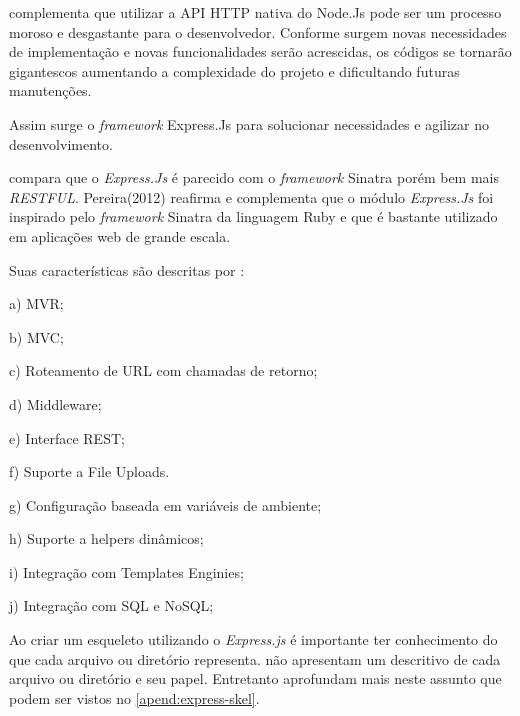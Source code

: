   \cite{Pereira:2013} complementa que utilizar a API HTTP nativa do Node.Js pode ser um processo moroso e desgastante
  para o desenvolvedor. 
  Conforme surgem novas necessidades de implementação e novas funcionalidades serão acrescidas,
  os códigos se tornarão gigantescos aumentando a complexidade do projeto e dificultando futuras manutenções.
  
  Assim surge o \textit{framework} Express.Js para solucionar necessidades e agilizar no desenvolvimento.
  
   compara que o \textit{Express.Js} é parecido com o \textit{framework} Sinatra porém bem mais \textit{RESTFUL}. 
  Pereira(2012) reafirma e complementa que o módulo \textit{Express.Js} foi inspirado pelo \textit{framework} Sinatra da 
  linguagem Ruby e que é bastante utilizado em aplicações web de grande escala.
  
  Suas características são descritas por :
  
  \begin{compactitem}
    \item[a)] \ac{MVR};   
    
    \item[b)] \ac{MVC};
    
    \item[c)] Roteamento de \ac{URL} com chamadas de retorno;
    
    \item[d)] Middleware;
    
    \item[e)] Interface \ac{REST};
    
    \item[f)] Suporte a File Uploads.
    
    \item[g)] Configuração baseada em variáveis de ambiente;
    
    \item[h)] Suporte a helpers dinâmicos;
    
    \item[i)] Integração com Templates Enginies;
    
    \item[j)] Integração com SQL e NoSQL;
    
  \end{compactitem}
  
  Ao criar um esqueleto utilizando o \textit{Express.js} é importante ter conhecimento do que cada
  arquivo ou diretório representa. \cite{Powers:2012, Hughes:2012} não apresentam um descritivo de cada arquivo 
  ou diretório e seu papel. Entretanto \cite{Pereira:2013, Wilson:2013} aprofundam mais neste assunto que podem ser vistos
  no \ref{apend:express-skel}.
  

